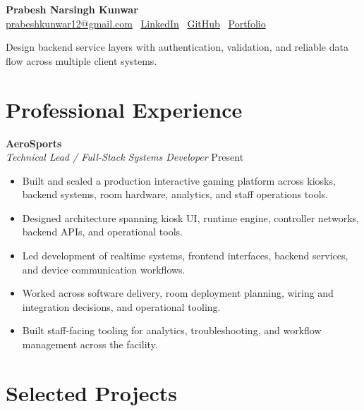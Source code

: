 \documentclass[a4paper,10pt]{article}
\newcommand{\tightvspace}{\vspace{2pt}}
\begin{document}
\begin{center}
    {\LARGE \textbf{Prabesh Narsingh Kunwar}} \\
    \tightvspace\href{mailto:prabeshkunwar12@gmail.com}{prabeshkunwar12@gmail.com} \textbar\ \href{https://www.linkedin.com/in/prabesh-kunwar/}{LinkedIn} \textbar\ \href{https://github.com/prabeshkunwar12}{GitHub} \textbar\ \href{https://prabeshkunwar12.github.io/portfolio/}{Portfolio}\end{center}

\noindent Design backend service layers with authentication, validation, and reliable data flow across multiple client systems.

\section*{Professional Experience}

\textbf{AeroSports} \\
\textit{Technical Lead / Full-Stack Systems Developer} \hfill Present
\begin{itemize}
    \item Built and scaled a production interactive gaming platform across kiosks, backend systems, room hardware, analytics, and staff operations tools.
    \item Designed architecture spanning kiosk UI, runtime engine, controller networks, backend APIs, and operational tools.
    \item Led development of realtime systems, frontend interfaces, backend services, and device communication workflows.
    \item Worked across software delivery, room deployment planning, wiring and integration decisions, and operational tooling.
    \item Built staff-facing tooling for analytics, troubleshooting, and workflow management across the facility.
\end{itemize}

\section*{Selected Projects}
\end{document}
